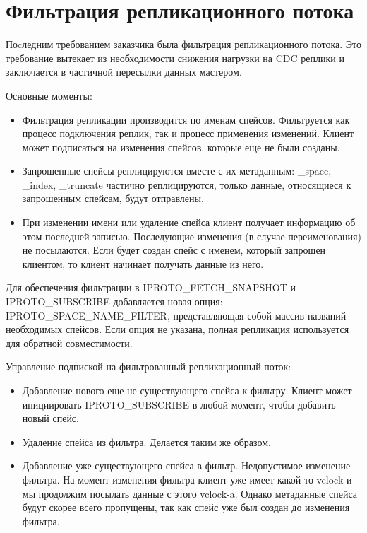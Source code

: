 \section{Фильтрация репликационного потока}

Поcледним требованием заказчика была фильтрация репликационного потока. Это требование вытекает из необходимости снижения нагрузки на CDC реплики и заключается в частичной пересылки данных мастером.

Основные моменты:

\begin{itemize}
    \item Фильтрация репликации производится по именам спейсов. Фильтруется как процесс подключения реплик, так и процесс применения изменений. Клиент может подписаться на изменения спейсов, которые еще не были созданы.
    \item Запрошенные спейсы реплицируются вместе с их метаданным: \_space, \_index, \_truncate частично реплицируются, только данные, относящиеся к запрошенным спейсам, будут отправлены.
    \item При изменении имени или удаление спейса клиент получает информацию об этом последней записью. Последующие изменения (в случае переименования) не посылаются. Если будет создан спейс с именем, который запрошен клиентом, то клиент начинает получать данные из него.
\end{itemize}

Для обеспечения фильтрации в IPROTO\_FETCH\_SNAPSHOT и IPROTO\_SUBSCRIBE добавляется новая опция: IPROTO\_SPACE\_NAME\_FILTER, представляющая собой массив названий необходимых спейсов. Если опция не указана, полная репликация используется для обратной совместимости.

Управление подпиской на фильтрованный репликационный поток:

\begin{itemize}
    \item Добавление нового еще не существующего спейса к фильтру. Клиент может инициировать IPROTO\_SUBSCRIBE в любой момент, чтобы добавить новый спейс.
    \item Удаление спейса из фильтра. Делается таким же образом.
    \item Добавление уже существующего спейса в фильтр. Недопустимое изменение фильтра. На момент изменения фильтра клиент уже имеет какой-то vclock и мы продолжим посылать данные с этого vclock-a. Однако метаданные спейса будут скорее всего пропущены, так как спейс уже был создан до изменения фильтра.
\end{itemize}
